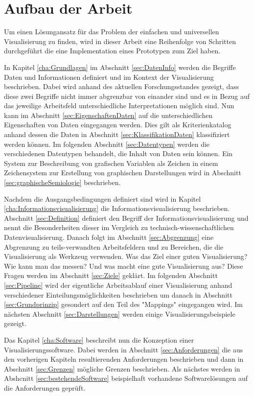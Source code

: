 \documentclass[a4paper, 12pt, DIVcalc, onepage, pdftex, headsepline, footsepline]{scrreprt}
\begin{document}
\section{Aufbau der Arbeit}
Um einen Lösungansatz für das Problem der einfachen und universellen Visualisierung zu finden, wird
in dieser Arbeit eine Reihenfolge von Schritten durchgeführt die eine Implementation eines
Prototypen zum Ziel haben.

In Kapitel \ref{cha:Grundlagen} im Abschnitt \ref{sec:DatenInfo} werden die Begriffe Daten und Informationen definiert und im Kontext
der Visualisierung beschrieben. Dabei wird anhand des aktuellen Forschungsstandes gezeigt, dass diese
zwei Begriffe nicht immer abgrenzbar von einander sind und es in Bezug auf das jeweilige Arbeitsfeld
unterschiedliche Interpretationen möglich sind. Nun kann im Abschnitt \ref{sec:EigenschaftenDaten} auf die
unterschiedlichen Eigenschaften von Daten eingegangen werden. Dies gilt als Kriterienkatalog anhand
dessen die Daten in Abschnitt \ref{sec:KlassifikationDaten} klassifiziert werden können.
Im folgenden Abschnitt \ref{sec:Datentypen} werden die verschiedenen Datentypen behandelt, die Inhalt
von Daten sein können.
Ein System zur Beschreibung von grafischen Variablen als Zeichen in einem Zeichensystem zur Erstellung von
graphischen Darstellungen wird in Abschnitt \ref{sec:graphischeSemiologie} beschrieben.

Nachdem die Ausgangsbedingungen definiert sind wird in Kapitel \ref{cha:Informationsvisualisierung} die
Informationsvisualisierung beschrieben. Abschnitt \ref{sec:Definition} definiert den Begriff
der Informationsvisualisierung und nennt die Besonderheiten dieser im Vergleich zu technisch-wissenschaftlichen
Datenvisualisierung. Danach folgt im Abschnitt \ref{sec:Abgrenzung} eine Abgrenzung zu teils-verwandten
Arbeitsfeldern und zu Bereichen, die die Visualisierung als Werkzeug verwenden. Was das Ziel einer guten
Visualisierung? Wie kann man das messen? Und was macht eine gute Visualisierung aus? Diese Fragen werden
im Abschnitt \ref{sec:Ziele} geklärt. Im folgenden Abschnitt \ref{sec:Pipeline} wird der eigentliche Arbeitsablauf
einer Visualisierung anhand verschiedener Einteilungsmöglichkeiten beschrieben um danach in Abschnitt
\ref{sec:Grundprinzip} gesondert auf den Teil des "Mappings" eingegangen wird. Im nächsten Abschnitt
\ref{sec:Darstellungen} werden einige Visualisierungsbeispiele gezeigt.

Das Kapitel \ref{cha:Software} beschreibt nun die Konzeption einer Visualisierungssoftware.
Dabei werden in Abschnitt \ref{sec:Anforderungen} die aus den vorherigen Kapiteln resultierenden Anforderungen
beschrieben und dann in Abschnitt \ref{sec:Grenzen} mögliche Grenzen beschrieben. Als nächstes
werden in Abshcnitt \ref{sec:bestehendeSoftware} beispielhaft vorhandene Softwarelösungen auf die Anforderungen geprüft.
\end{document}

